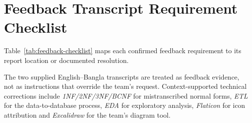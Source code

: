 
\section{Feedback Transcript Requirement Checklist}
\label{app:feedback}

Table~\ref{tab:feedback-checklist} maps each confirmed feedback requirement to
its report location or documented resolution.

The two supplied English--Bangla transcripts are treated as feedback evidence,
not as instructions that override the team's request. Context-supported
technical corrections include \emph{1NF/2NF/3NF/BCNF} for mistranscribed normal
forms, \emph{ETL} for the data-to-database process, \emph{EDA} for exploratory
analysis, \emph{Flaticon} for icon attribution and \emph{Excalidraw} for the
team's diagram tool.

